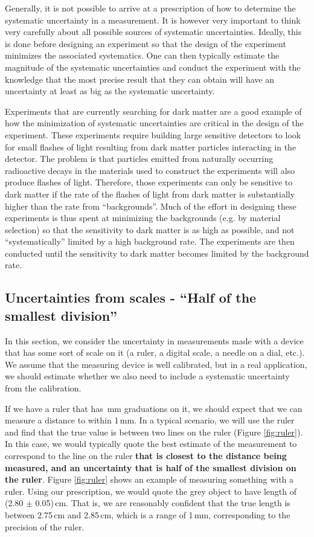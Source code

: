 Generally, it is not possible to arrive at a prescription of how to determine the systematic uncertainty in a measurement. It is however very important to think very carefully about all possible sources of systematic uncertainties. Ideally, this is done before designing an experiment so that the design of the experiment minimizes the associated systematics. One can then typically estimate the magnitude of the systematic uncertainties and conduct the experiment with the knowledge that the most precise result that they can obtain will have an uncertainty at least as big as the systematic uncertainty.

Experiments that are currently searching for dark matter are a good example of how the minimization of systematic uncertainties are critical in the design of the experiment. These experiments require building large sensitive detectors to look for small flashes of light resulting from dark matter particles interacting in the detector. The problem is that particles emitted from naturally occurring radioactive decays in the materials used to construct the experiments will also produce flashes of light. Therefore, those experiments can only be sensitive to dark matter if the rate of the flashes of light from dark matter is substantially higher than the rate from ``backgrounds''. Much of the effort in designing these experiments is thus spent at minimizing the backgrounds (e.g. by material selection) so that the sensitivity to dark matter is as high as possible, and not ``systematically'' limited by a high background rate. The experiments are then conducted until the sensitivity to dark matter becomes limited by the background rate.


\subsection{Uncertainties from scales - ``Half of the smallest division''}
In this section, we consider the uncertainty in measurements made with a device that has some sort of scale on it (a ruler, a digital scale, a needle on a dial, etc.). We assume that the measuring device is well calibrated, but in a real application, we should estimate whether we also need to include a systematic uncertainty from the calibration. 

If we have a ruler that has \,mm graduations on it, we should expect that we can measure a distance to within 1\,mm. In a typical scenario, we will use the ruler and find that the true value is between two lines on the ruler (Figure \ref{fig:ruler}). In this case, we would typically quote the best estimate of the measurement to correspond to the line on the ruler \textbf{that is closest to the distance being measured, and an uncertainty that is half of the smallest division on the ruler}. Figure \ref{fig:ruler} shows an example of measuring something with a ruler. Using our prescription, we would quote the grey object to have length of (2.80 $\pm$ 0.05)\,cm. That is, we are reasonably confident that the true length is between 2.75\,cm and 2.85\,cm, which is a range of 1\,mm, corresponding to the precision of the ruler. 

